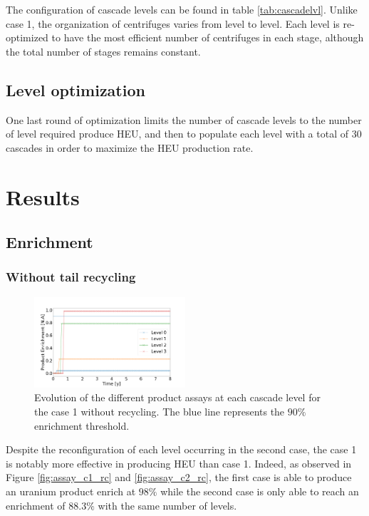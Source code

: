 \documentclass{anstrans}
\begin{document}
The configuration of cascade levels can be found in table
\ref{tab:cascadelvl}. Unlike case 1, the organization of centrifuges varies from
level to level. Each level is re-optimized to have the most efficient number of
centrifuges in each stage, although the total number of stages remains constant.


\subsection{Level optimization}

One last round of optimization limits the number of cascade
levels to the number of level required produce HEU, and then to populate each level with a total of 30 cascades in order to maximize the HEU production rate.

\section{Results}
\subsection{Enrichment}
\subsubsection{Without tail recycling}

\begin{figure}[ht] %
  \centering
  \includegraphics[width=0.5\textwidth]{assay_case_1_no_rec.png}
  \caption{Evolution of the different product assays at each cascade level for
  the case 1 without recycling. The blue line represents the $90\%$ enrichment
  threshold.}\label{fig:assay_c1_nr}
\end{figure}
Despite the reconfiguration of each level occurring in the second case, the case
1 is notably more effective in producing HEU than case 1. Indeed, as observed in
Figure \ref{fig:assay_c1_rc} and \ref{fig:assay_c2_rc}, the first case is able
to produce an uranium product enrich at $98\%$ while the second case is only
able to reach an enrichment of $88.3\%$ with the same number of levels.
\end{document}
